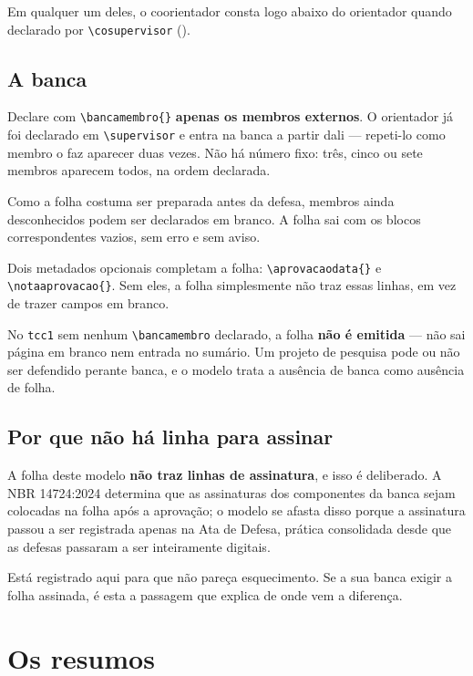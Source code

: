 Em qualquer um deles, o coorientador consta logo abaixo do orientador quando declarado por
\verb|\cosupervisor| ().

\subsection{A banca}\label{ssc:banca}

Declare com \verb|\bancamembro{}| \textbf{apenas os membros externos}. O orientador já foi declarado
em \verb|\supervisor| e entra na banca a partir dali --- repeti-lo como membro o faz aparecer duas
vezes. Não há número fixo: três, cinco ou sete membros aparecem todos, na ordem declarada.

Como a folha costuma ser preparada antes da defesa, membros ainda desconhecidos podem ser
declarados em branco. A folha sai com os blocos correspondentes vazios, sem erro e sem aviso.

Dois metadados opcionais completam a folha: \verb|\aprovacaodata{}| e \verb|\notaaprovacao{}|. Sem
eles, a folha simplesmente não traz essas linhas, em vez de trazer campos em branco.

No \texttt{tcc1} sem nenhum \verb|\bancamembro| declarado, a folha \textbf{não é emitida} --- não sai
página em branco nem entrada no sumário. Um projeto de pesquisa pode ou não ser defendido perante
banca, e o modelo trata a ausência de banca como ausência de folha.

\subsection{Por que não há linha para assinar}\label{ssc:sem-assinatura}

A folha deste modelo \textbf{não traz linhas de assinatura}, e isso é deliberado. A NBR 14724:2024
determina que as assinaturas dos componentes da banca sejam colocadas na folha após a aprovação; o
modelo se afasta disso porque a assinatura passou a ser registrada apenas na Ata de Defesa, prática
consolidada desde que as defesas passaram a ser inteiramente digitais.

Está registrado aqui para que não pareça esquecimento. Se a sua banca exigir a folha assinada, é
esta a passagem que explica de onde vem a diferença.

\section{Os resumos}\label{sec:resumos}

